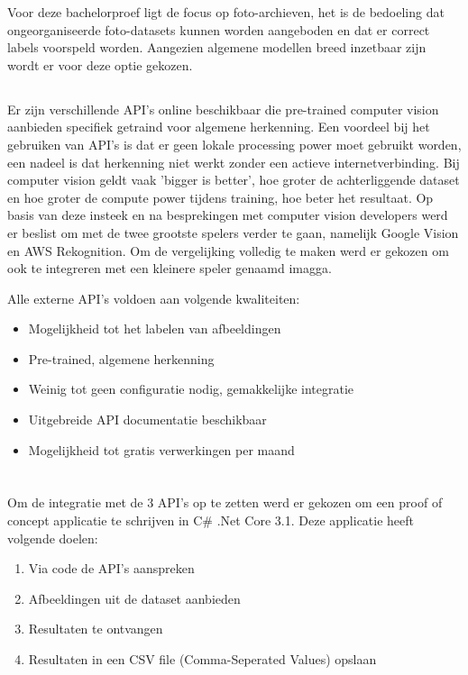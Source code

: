 Voor deze bachelorproef ligt de focus op foto-archieven, het is de bedoeling dat ongeorganiseerde foto-datasets kunnen worden aangeboden en dat er correct labels voorspeld worden. Aangezien algemene modellen breed inzetbaar zijn wordt er voor deze optie gekozen.

\subsection{}
\label{sec:keuze-externe-API}
Er zijn verschillende API's online beschikbaar die pre-trained computer vision aanbieden specifiek getraind voor algemene herkenning. Een voordeel bij het gebruiken van API's is dat er geen lokale processing power moet gebruikt worden, een nadeel is dat herkenning niet werkt zonder een actieve internetverbinding. Bij computer vision geldt vaak 'bigger is better', hoe groter de achterliggende dataset en hoe groter de compute power tijdens training, hoe beter het resultaat. Op basis van deze insteek en na besprekingen met computer vision developers werd er beslist om met de twee grootste spelers verder te gaan, namelijk Google Vision en AWS Rekognition. Om de vergelijking volledig te maken werd er gekozen om ook te integreren met een kleinere speler genaamd imagga.

Alle externe API's voldoen aan volgende kwaliteiten:
 \begin{itemize}
     \item Mogelijkheid tot het labelen van afbeeldingen
     \item Pre-trained, algemene herkenning
     \item Weinig tot geen configuratie nodig, gemakkelijke integratie
     \item Uitgebreide API documentatie beschikbaar
     \item Mogelijkheid tot gratis verwerkingen per maand
 \end{itemize}

\section{}
\label{sec:integratie-met-computer-vision}
Om de integratie met de 3 API's op te zetten werd er gekozen om een proof of concept applicatie te schrijven in C\# .Net Core 3.1. Deze applicatie heeft volgende doelen:
 \begin{enumerate}
    \item Via code de API's aanspreken
    \item Afbeeldingen uit de dataset aanbieden
    \item Resultaten te ontvangen
    \item Resultaten in een CSV file (Comma-Seperated Values) opslaan
\end{enumerate}

